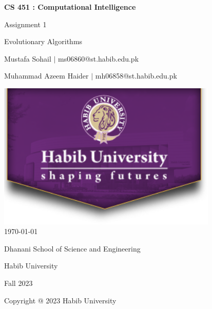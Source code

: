 \documentclass[12pt]{article}
\begin{document}
\begin{titlepage}
    \centering
    {\LARGE\textbf{CS 451 : Computational Intelligence}\par}
    \vspace{0.5cm}
    {\Large Assignment 1\par}
    \vspace{0.2cm}
    {\Large Evolutionary Algorithms\par}
    \vspace*{\fill} %
    {\large Mustafa Sohail $\mid$ ms06860@st.habib.edu.pk\par}
    {\large Muhammad Azeem Haider $\mid$ mh06858@st.habib.edu.pk\par}
    \vspace{2cm}
    \includegraphics[height=7cm]{HU_logo}\\\bigskip
    {\large \today}\\\bigskip\bigskip
    \vspace{1cm}
    \vspace{2cm}
    {\large Dhanani School of Science and Engineering\par}
    {\large Habib University\par}
    {\large Fall 2023\par}
    \vspace*{\fill} %
    {\large Copyright @ 2023 Habib University\par}
\end{titlepage}

\thispagestyle{empty} %
\tableofcontents
\clearpage
\end{document}
